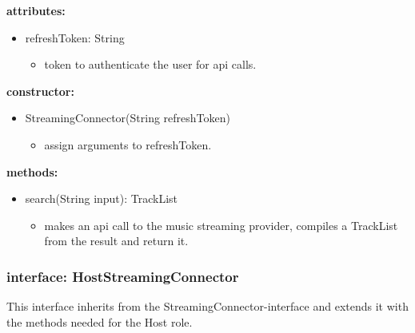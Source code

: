 \documentclass[oneside, ngerman]{sdqtechreport}
\begin{document}
\textbf{attributes:}
\begin{itemize}
    \item refreshToken: String
    \begin{itemize}
        \item token to authenticate the user for api calls.
    \end{itemize}
    
\end{itemize}
\textbf{constructor:}
\begin{itemize}
    \item StreamingConnector(String refreshToken)
    \begin{itemize}
        \item assign arguments to refreshToken.
    \end{itemize}
\end{itemize}
\textbf{methods:}
\begin{itemize}
    \item search(String input): TrackList
    \begin{itemize}
        \item makes an api call to the music streaming provider, compiles a TrackList from the result and return it. 
    \end{itemize}
\end{itemize}

\subsubsection{interface: HostStreamingConnector}
This interface inherits from the StreamingConnector-interface and extends it with the methods needed for the Host role. 
\end{document}
